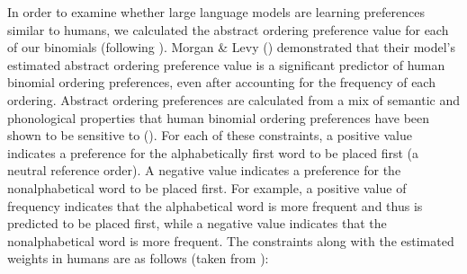 \documentclass[
  12pt,
  letterpaper,
]{scrreport}
\begin{document}
In order to examine whether large language models are learning
preferences similar to humans, we calculated the abstract ordering
preference value for each of our binomials (following
). Morgan \& Levy
() demonstrated
that their model's estimated abstract ordering preference value is a
significant predictor of human binomial ordering preferences, even after
accounting for the frequency of each ordering. Abstract ordering
preferences are calculated from a mix of semantic and phonological
properties that human binomial ordering preferences have been shown to
be sensitive to (). For each of these constraints, a positive value
indicates a preference for the alphabetically first word to be placed
first (a neutral reference order). A negative value indicates a
preference for the nonalphabetical word to be placed first. For example,
a positive value of frequency indicates that the alphabetical word is
more frequent and thus is predicted to be placed first, while a negative
value indicates that the nonalphabetical word is more frequent. The
constraints along with the estimated weights in humans are as follows
(taken from ):
\end{document}

